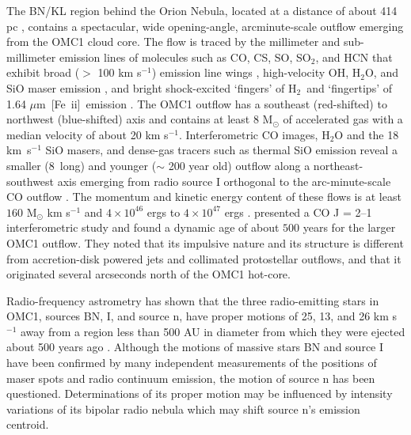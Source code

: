 \documentclass{aa}
\newcommand{\Feii}{[Fe~{\sc ii}]}
\newcommand{\um}{$\mu$m}
\newcommand{\hh}{\ensuremath{\textrm{H}_{2}}}			%
\begin{document}
The BN/KL region behind the Orion Nebula, located at a distance of about
414 pc \citep{Menten2007},  contains a spectacular,  wide opening-angle, 
arcminute-scale outflow emerging from the OMC1 cloud core.  The flow is 
traced by the millimeter and sub-millimeter emission lines of molecules 
such as CO, CS, SO, SO$_2$, and HCN  that exhibit  broad  
($>$ 100 km s$^{-1}$)  emission line wings 
\citep{KwanScoville1976, WisemanHo1996, FuruyaShinnaga2009},  
high-velocity OH, H$_2$O,  and SiO maser  emission \citep{Genzel1981,Greenhill1998}, 
and bright shock-excited `fingers' of  \hh\   and `fingertips' of 1.64 \um\  \Feii\   
emission \citep{AllenBurton93, Colgan2007, Nissen2007, 
LeeBurton2000, Bally2011}.    The OMC1 outflow has a southeast 
(red-shifted) to  northwest (blue-shifted) axis and contains  at least 8 M$_{\odot}$ of  
accelerated gas with a median velocity of about  20 km s$^{-1}$.     Interferometric 
CO images, H$_2$O and the 18 km~s$^{-1}$  SiO masers,   and dense-gas  
tracers such as  thermal SiO emission reveal a  smaller (8\arcsec\  long) 
and younger  ($\sim$ 200  year old) outflow along a  northeast-southwest axis 
emerging  from radio source I   orthogonal to the arc-minute-scale  CO outflow  
\citep{BeutherNissen2008,Plambeck2009}.    
The  momentum and kinetic   energy content of these flows is at least  
$160$ M$_{\odot}$ km s$^{-1}$ and  $4 \times 10^{46}$  ergs  \citep{Snell1984} to  
$4 \times 10^{47}$ ergs  \citep{KwanScoville1976}.     \citet{Zapata2009}  presented 
a CO J = 2--1 interferometric study and found a dynamic age of  about $500$ 
years for the larger OMC1 outflow.   They noted that its impulsive nature and 
its  structure is  different from accretion-disk  powered  jets and collimated 
protostellar outflows,  and that it  originated several arcseconds 
north of the  OMC1 hot-core.       

Radio-frequency astrometry has shown that
the three  radio-emitting stars in OMC1, sources BN, I, and 
source n, have  proper motions  of 25, 13, and 26 km s$^{-1}$ 
away from a region less than 500 AU in diameter from which they were ejected 
about  500 years ago \citep{Rodriguez2005,Gomez2005,Gomez2008}.    Although
the motions of massive stars BN and source I have been confirmed by many 
independent measurements of the positions of maser spots and radio continuum 
emission,  the motion of source n has been questioned.  Determinations of its  
proper  motion may be influenced by intensity variations of its bipolar radio nebula 
which may shift source n's  emission centroid. 
  
\end{document}
